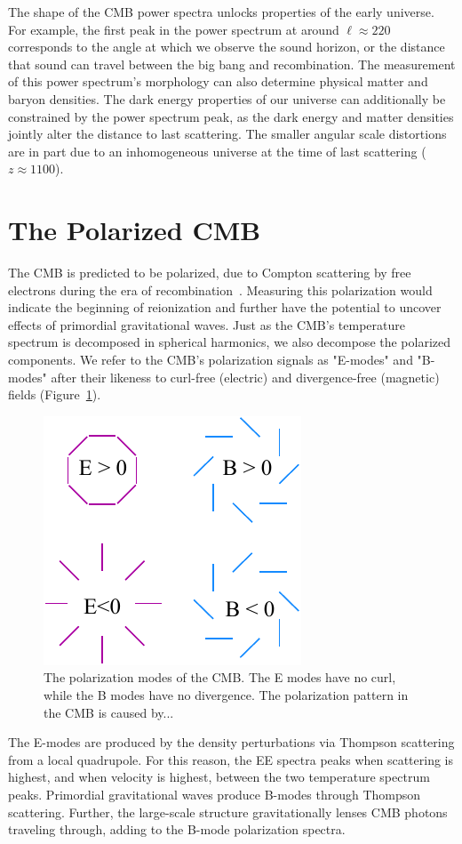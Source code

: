 The shape of the CMB power spectra unlocks properties of the early universe.  For example, the first peak in the power spectrum at around $\ell\approx220$ corresponds to the angle at which we observe the sound horizon, or the distance that sound can travel between the big bang and recombination.  The measurement of this power spectrum's morphology can also determine physical matter and baryon densities.  The dark energy properties of our universe can additionally be constrained by the power spectrum peak, as the dark energy and matter densities jointly alter the distance to last scattering.  The smaller angular scale distortions are in part due to an inhomogeneous universe at the time of last scattering ($z\approx 1100$).  

\section{The Polarized CMB}

The CMB is predicted to be polarized, due to Compton scattering by free electrons during the era of recombination~\cite{weinberg_cosmo}.  Measuring this polarization would indicate the beginning of reionization and further have the potential to uncover effects of primordial gravitational waves.  Just as the CMB's temperature spectrum is decomposed in spherical harmonics, we also decompose the polarized components.  We refer to the CMB's polarization signals as "E-modes" and "B-modes" after their likeness to curl-free (electric) and divergence-free (magnetic) fields (Figure~\ref{fig:e_b_pol}).
\begin{figure}
    \centering
    \includegraphics[width = .45\textwidth]{Figures/EB_pol.pdf}
    \caption{The polarization modes of the CMB.  The E modes have no curl, while the B modes have no divergence.  The polarization pattern in the CMB is caused by...}
    \label{fig:e_b_pol}
\end{figure}

The E-modes are produced by the density perturbations via Thompson scattering from a local quadrupole.  For this reason, the EE spectra peaks when scattering is highest, and when velocity is highest, between the two temperature spectrum peaks.  Primordial gravitational waves produce B-modes through Thompson scattering.  Further, the large-scale structure gravitationally lenses CMB photons traveling through, adding to the B-mode polarization spectra.

